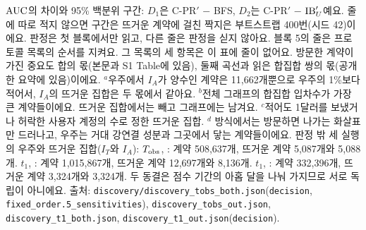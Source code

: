 \begin{table}[!htbp]

\begin{minipage}{\linewidth}\footnotesize\raggedright\vspace{0.4em}
$\mathrm{AUC}$의 차이와 95\% 백분위 구간: $D_1$은 C-PR$'$ − BFS, $D_2$는 C-PR$'$ − $\mathrm{IB}'_U$예요. 줄에 따로 적지 않으면 구간은 뜨거운 계약에 걸친 짝지은 부트스트랩 400번(시드 42)이에요. 판정은 첫 블록에서만 읽고, 다른 줄은 판정을 싣지 않아요. 블록 5의 줄은 프로토콜 목록의 순서를 지켜요. 그 목록의 세 항목은 이 표에 줄이 없어요. 방문한 계약이 가진 중요도 합의 몫(본문과 S1 Table에 있음), 둘째 곡선과 읽은 합집합 쌍의 몫(공개한 요약에 있음)이에요. $^{a}$우주에서 $I_A$가 양수인 계약은 11,662개뿐으로 우주의 1\%보다 적어서, $I_A$의 뜨거운 집합은 두 몫에서 같아요. $^{b}$전체 그래프의 합집합 입차수가 가장 큰 계약들이에요. 뜨거운 집합에서는 빼고 그래프에는 남겨요. $^{c}$적어도 1달러를 보냈거나 허락한 사용자 계정의 수로 정한 뜨거운 집합. $^{d}$\outm{} 방식에서는 방문하면 나가는 화살표만 드러나고, 우주는 거대 강연결 성분과 그곳에서 닿는 계약들이에요. 판정 밖 세 실행의 우주와 뜨거운 집합($I_T$와 $I_A$): $T_{\mathrm{obs}}$, \outm{}: 계약 508,637개, 뜨거운 계약 5,087개와 5,088개. $t_1$, \both{}: 계약 1,015,867개, 뜨거운 계약 12,697개와 8,136개. $t_1$, \outm{}: 계약 332,396개, 뜨거운 계약 3,324개와 3,324개. 두 동결은 점수 기간의 아홉 달을 나눠 가지므로 서로 독립이 아니에요. 출처: \texttt{discovery/discovery\_tobs\_both.json}(\texttt{decision}, \texttt{fixed\_order.5\_sensitivities}), \texttt{discovery\_tobs\_out.json}, \texttt{discovery\_t1\_both.json}, \texttt{discovery\_t1\_out.json}(\texttt{decision}).
\end{minipage}
\end{table}

